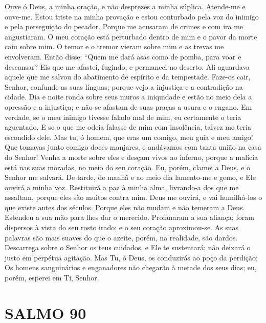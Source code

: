 \documentclass{subfiles}
\begin{document}
Ouve ó Deus, a minha oração, e não desprezes a minha súplica.
Atende-me e ouve-me. Estou triste na minha provação e estou conturbado
pela voz do inimigo e pela perseguição do pecador. Porque me acusaram de
crimes e com ira me angustiaram. O meu coração está perturbado dentro de
mim e o pavor da morte caiu sobre mim. O temor e o tremor vieram sobre
mim e as trevas me envolveram. Então disse: “Quem me dará asas como de
pomba, para voar e descansar? Eis que me afastei, fugindo, e permaneci no
deserto. Ali aguardava aquele que me salvou do abatimento de espírito e da
tempestade. Faze-os cair, Senhor, confunde as suas línguas; porque vejo a
injustiça e a contradição na cidade. Dia e noite ronda sobre seus muros a
iniquidade e estão no meio dela a opressão e a injustiça; e não se afastam de
suas praças a usura e o engano. Em verdade, se o meu inimigo tivesse falado
mal de mim, eu certamente o teria aguentado. E se o que me odeia falasse de
mim com insolência, talvez me teria escondido dele. Mas tu, ó homem, que
eras um comigo, meu guia e meu amigo! Que tomavas junto comigo doces
manjares, e andávamos com tanta união na casa do Senhor! Venha a morte
sobre eles e desçam vivos ao inferno, porque a malícia está nas suas moradas,
no meio do seu coração. Eu, porém, clamei a Deus, e o Senhor me salvará. De
tarde, de manhã e ao meio dia lamento-me e gemo, e Ele ouvirá a minha voz.
Restituirá a paz à minha alma, livrando-a dos que me assaltam, porque eles
são muitos contra mim. Deus me ouvirá, e vai humilhá-los o que existe antes
dos séculos. Porque eles não mudam e não temeram a Deus. Estendeu a sua
mão para lhes dar o merecido. Profanaram a sua aliança; foram dispersos à
vista do seu rosto irado; e o seu coração aproximou-se. As suas palavras são
mais suaves do que o azeite, porém, na realidade, são dardos. Descarrega
sobre o Senhor os teus cuidados, e Ele te sustentará; não deixará o justo em
perpétua agitação. Mas Tu, ó Deus, os conduzirás ao poço da perdição; Os
homens sanguinários e enganadores não chegarão à metade dos seus dias; eu,
porém, esperei em Ti, Senhor.

\section*{SALMO 90}
\end{document}
